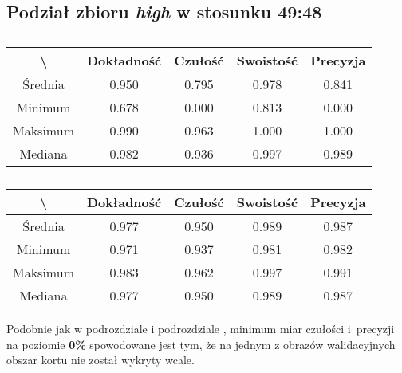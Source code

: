 \subsection{Podział zbioru \textit{high} w stosunku 49:48}
\label{sec:highsplitd}


\begin{table}[H]
	\centering
	\caption{}
	\vspace{6pt}
	{\footnotesize
		\begin{tabular}{|c|c|c|c|c|}
      \hline \textbackslash & Dokładność & Czułość & Swoistość & Precyzja \\
      \hline Średnia & 0.950 & 0.795 & 0.978 & 0.841 \\
      \hline Minimum & 0.678 & 0.000 & 0.813 & 0.000 \\
      \hline Maksimum & 0.990 & 0.963 & 1.000 & 1.000 \\
      \hline Mediana & 0.982 & 0.936 & 0.997 & 0.989 \\
      \hline
    \end{tabular}
    \label{Tab:highsplitd_val}
	}
	\vspace{0pt}
\end{table}

\begin{table}[H]
	\centering
	\caption{}
	\vspace{6pt}
	{\footnotesize
		\begin{tabular}{|c|c|c|c|c|}
      \hline \textbackslash & Dokładność & Czułość & Swoistość & Precyzja \\
      \hline Średnia & 0.977 & 0.950 & 0.989 & 0.987 \\
      \hline Minimum & 0.971 & 0.937 & 0.981 & 0.982 \\
      \hline Maksimum & 0.983 & 0.962 & 0.997 & 0.991 \\
      \hline Mediana & 0.977 & 0.950 & 0.989 & 0.987 \\
      \hline
    \end{tabular}
    \label{Tab:highsplitd_test}
	}
	\vspace{0pt}
\end{table}

Podobnie jak w podrozdziale  i podrozdziale , minimum miar czułości i~precyzji na poziomie \textbf{0\%} spowodowane jest tym, że na jednym z obrazów walidacyjnych obszar kortu nie został wykryty wcale.
